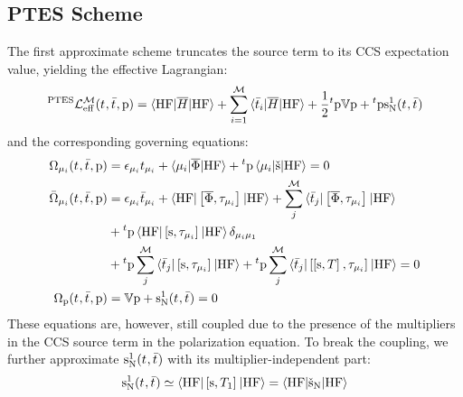 \subsection*{PTES Scheme}


The first approximate scheme truncates the source term to its \acs{CCS}
expectation value, yielding the effective Lagrangian:
\begin{equation}\label{eq:ptes-cc}
  {}^{\mathrm{PTES}}\mathcal{L}^\mathcal{M}_\mathrm{eff}(t_{}, \bar{t}_{}, \mathrm{p}) =
  \braket{\mathrm{HF} | \overline{H} | \mathrm{HF}}
  + \sum_{i=1}^{\mathcal{M}}\braket{\bar{t}_{i} | \overline{H} | \mathrm{HF}}
  + \frac{1}{2}{}^t\mathrm{p}\mathbb{V}\mathrm{p} + {}^t\mathrm{p}\mathrm{s}_{\mathrm{N}}^1(t_{}, \bar{t}_{})
\end{equation}
and the corresponding governing equations:
\begin{subequations}
  \begin{align}
   \Omega_{\mu_i}(t_{}, \bar{t}_{}, \mathrm{p})  &=
   \epsilon_{\mu_i}t_{\mu_i} + \braket{\mu_i | \overline{\Phi} | \mathrm{HF}}
   + {}^t\mathrm{p}\braket{\mu_i | \check{\mathrm{s}} | \mathrm{HF}}
             = 0 \\
   \bar{\Omega}_{\mu_i}(t_{}, \bar{t}_{}, \mathrm{p})
    &=
    \epsilon_{\mu_i}\bar{t}_{\mu_i} +
    \braket{\mathrm{HF} | \left[ \overline{\Phi}, \tau_{\mu_i} \right]^{} | \mathrm{HF}} +
    \sum_{j}^{\mathcal{M}}\braket{\bar{t}_{j} |
    \left[ \overline{\Phi}, \tau_{\mu_i} \right]^{} | \mathrm{HF}}
    \nonumber \\
    &+
    {}^t\mathrm{p}\braket{\mathrm{HF} | \left[ \mathrm{s}, \tau_{\mu_i} \right]^{} | \mathrm{HF}}\delta_{\mu_i\mu_1} \nonumber \\
    &+
    {}^t\mathrm{p}\sum_{j}^{\mathcal{M}}\braket{\bar{t}_{j} | \left[ \mathrm{s}, \tau_{\mu_i} \right]^{} | \mathrm{HF}}
    +
    {}^t\mathrm{p}\sum_{j}^{\mathcal{M}}\braket{\bar{t}_{j} | \left[ \left[ \mathrm{s}, T \right]^{}, \tau_{\mu_i} \right]^{} | \mathrm{HF}}
             = 0 \\
    \Omega_{\mathrm{p}}(t_{}, \bar{t}_{}, \mathrm{p})
    &=
    \mathbb{V}\mathrm{p} + \mathrm{s}_{\mathrm{N}}^1(t_{}, \bar{t}_{}) = 0
  \end{align}
\end{subequations}
These equations are, however, still coupled due to the presence of the
multipliers in the \acs{CCS} source term in the polarization equation.
To break the coupling, we further approximate $\mathrm{s}_{\mathrm{N}}^1(t_{}, \bar{t}_{})$
with its multiplier-independent part:
\begin{equation}
  \mathrm{s}_{\mathrm{N}}^1(t_{}, \bar{t}_{})
  \simeq
  \braket{\mathrm{HF} | \left[ \mathrm{s}, T_1 \right]^{} | \mathrm{HF}}
  =
  \braket{\mathrm{HF} | \check{\mathrm{s}}_{\mathrm{N}} | \mathrm{HF}}
\end{equation}

